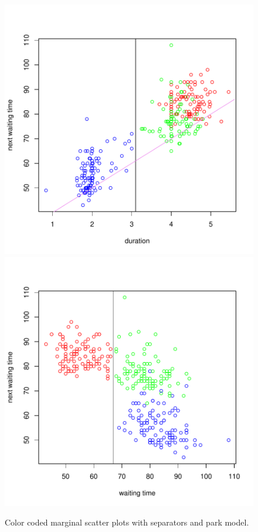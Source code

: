 \documentclass[english,final]{scrartcl}
\begin{document}
\begin{figure}[htbp]
\centering
\includegraphics{Geyser-Analysis-dur_opred_plot}
\hspace{1cm}
\includegraphics{Geyser-Analysis-wait_plot}
\caption{Color coded marginal scatter plots with separators and park model.}
\label{fig:cluster}
\end{figure}
\end{document}
